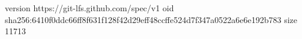version https://git-lfs.github.com/spec/v1
oid sha256:6410f0ddc66ff8f631f128f42d29eff48ccffe524d7f347a0522a6e6e192b783
size 11713
